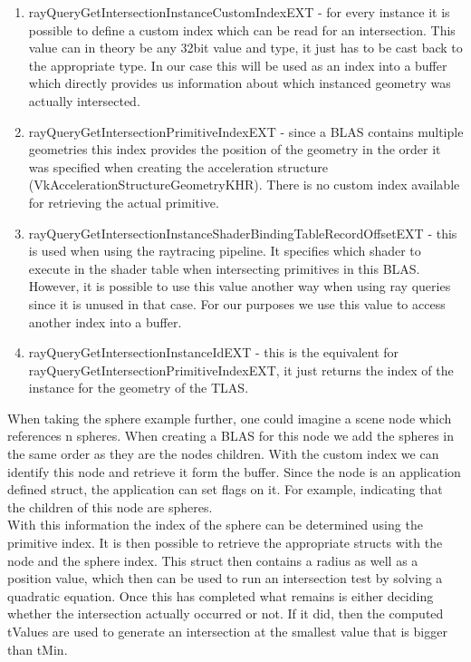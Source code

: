 \begin{enumerate}
    \item rayQueryGetIntersectionInstanceCustomIndexEXT - for every instance it is possible to define a custom index which can be read for an intersection. This value can in theory be any 32bit value and type, it just has to be cast back to the appropriate type. In our case this will be used as an index into a buffer which directly provides us information about which instanced geometry was actually intersected.
    \item rayQueryGetIntersectionPrimitiveIndexEXT - since a BLAS contains multiple geometries this index provides the position of the geometry in the order it was specified when creating the acceleration structure (VkAccelerationStructureGeometryKHR). There is no custom index available for retrieving the actual primitive.
    \item rayQueryGetIntersectionInstanceShaderBindingTableRecordOffsetEXT - this is used when using the raytracing pipeline. It specifies which shader to execute in the shader table when intersecting primitives in this BLAS. However, it is possible to use this value another way when using ray queries since it is unused in that case. For our purposes we use this value to access another index into a buffer.
    \item rayQueryGetIntersectionInstanceIdEXT - this is the equivalent for rayQueryGetIntersectionPrimitiveIndexEXT, it just returns the index of the instance for the geometry of the TLAS.
\end{enumerate}
When taking the sphere example further, one could imagine a scene node which references n spheres. When creating a BLAS for this node we add the spheres in the same order as they are the nodes children. With the custom index we can identify this node and retrieve it form the buffer. Since the node is an application defined struct, the application can set flags on it. For example, indicating that the children of this node are spheres.\\
With this information the index of the sphere can be determined using the primitive index. It is then possible to retrieve the appropriate structs with the node and the sphere index. This struct then contains a radius as well as a position value, which then can be used to run an intersection test by solving a quadratic equation. Once this has completed what remains is either deciding whether the intersection actually occurred or not. If it did, then the computed tValues are used to generate an intersection at the smallest value that is bigger than tMin.\\
